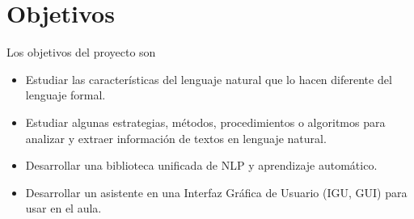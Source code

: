 
\chapter{Objetivos}

Los objetivos del proyecto son

\begin{itemize}
\item Estudiar las características del lenguaje natural que lo hacen diferente del lenguaje formal.
\item Estudiar algunas estrategias, métodos, procedimientos o algoritmos para analizar y extraer información de textos en lenguaje natural.
\item Desarrollar una biblioteca unificada de NLP y aprendizaje automático.
\item Desarrollar un asistente en una Interfaz Gráfica de Usuario (IGU, GUI) para usar en el aula.
\end{itemize}
